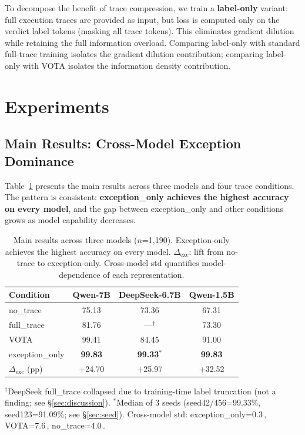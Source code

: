 \documentclass[11pt]{article}
\newcommand{\best}[1]{\textbf{\textcolor{bestcolor}{#1}}}
\newcommand{\pp}{\,\text{pp}}
\begin{document}
To decompose the benefit of trace compression, we train a \textbf{label-only} variant: full execution traces are provided as input, but loss is computed only on the verdict label tokens (masking all trace tokens).
This eliminates gradient dilution while retaining the full information overload.
Comparing label-only with standard full-trace training isolates the gradient dilution contribution; comparing label-only with VOTA isolates the information density contribution.


\section{Experiments}
\label{sec:experiments}

\subsection{Main Results: Cross-Model Exception Dominance}
\label{sec:main_results}

Table~\ref{tab:main} presents the main results across three models and four trace conditions.
The pattern is consistent: \textbf{exception\_only achieves the highest accuracy on every model}, and the gap between exception\_only and other conditions grows as model capability decreases.

\begin{table}[t]
\centering
\small
\caption{Main results across three models ($n$=1{,}190). Exception-only achieves the highest accuracy on every model. $\Delta_{\text{exc}}$: lift from no-trace to exception-only. Cross-model std quantifies model-dependence of each representation.}
\label{tab:main}
\begin{tabular}{@{}lccc@{}}
\toprule
\textbf{Condition} & \textbf{Qwen-7B} & \textbf{DeepSeek-6.7B} & \textbf{Qwen-1.5B} \\
\midrule
no\_trace         & 75.13 & 73.36 & 67.31 \\
full\_trace       & 81.76 & ---$^\dagger$ & 73.30 \\
VOTA              & 99.41 & 84.45 & 91.00 \\
exception\_only   & \best{99.83} & \best{99.33}$^*$ & \best{99.83} \\
\midrule
$\Delta_{\text{exc}}$ (pp) & +24.70 & +25.97 & +32.52 \\
\bottomrule
\end{tabular}
\vspace{2pt}
\begin{flushleft}
\footnotesize
$^\dagger$DeepSeek full\_trace collapsed due to training-time label truncation (not a finding; see \S\ref{sec:discussion}).
$^*$Median of 3 seeds (seed42/456=99.33\%, seed123=91.09\%; see \S\ref{sec:seed}).
Cross-model std: exception\_only=0.3\pp, VOTA=7.6\pp, no\_trace=4.0\pp.
\end{flushleft}
\end{table}
\end{document}
